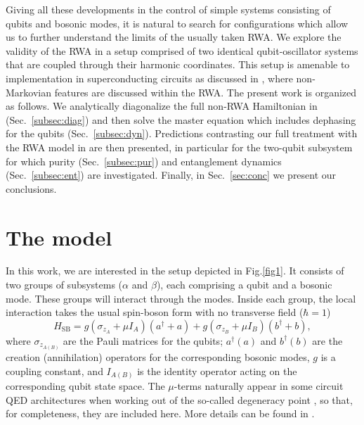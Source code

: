 \documentclass[%
reprint,
amsmath,amssymb,
aps,
pra,
]{revtex4-1}
\begin{document}
Giving all these developments in the control of simple systems consisting of qubits and bosonic modes, it is natural to search for configurations which allow us to further understand the limits of the usually taken RWA.  We explore the validity of the RWA in a setup comprised of two identical qubit-oscillator systems that are coupled through their harmonic coordinates. This setup is amenable to implementation in superconducting circuits as discussed in  \cite{car15}, where non-Markovian features are discussed within the RWA. The present work is organized as follows. We analytically diagonalize the full non-RWA Hamiltonian in (Sec.~\ref{subsec:diag}) and then solve the master equation which includes dephasing for the qubits (Sec.~\ref{subsec:dyn}). Predictions contrasting our full treatment with the RWA model in  \cite{car15} are then presented, in particular for the two-qubit subsystem for which purity (Sec.~\ref{subsec:pur}) and entanglement dynamics (Sec.~\ref{subsec:ent}) are investigated. Finally, in Sec.~\ref{sec:conc} we present our conclusions.
\section{\label{sec:model}The model}
%
%
In this work, we are interested in the setup depicted in Fig.\ref{fig1}. It consists of two groups of subsystems ($\alpha$ and $\beta$), each comprising a qubit and a bosonic mode. These groups will interact through the modes. Inside each group, the local interaction takes the usual spin-boson form with no transverse field ($\hbar=1$)
\begin{equation}
H_{\text{SB}} = g\left(\sigma_{z_A}+\mu I_A\right)\left(a^{\dagger}+a\right)+g\left(\sigma_{z_B}+\mu I_B\right)\left(b^{\dagger}+b\right),
\label{eq:sbH}
\end{equation}
where $\sigma_{z_{A(B)}}$ are the Pauli matrices for the qubits; $a^{\dagger}(a)$ and $b^{\dagger}(b)$ are the creation (annihilation) operators for the corresponding bosonic modes, $g$ is a coupling constant, and $I_{A(B)}$ is the identity operator acting on the corresponding qubit state space. The $\mu$-terms  naturally appear in some circuit QED architectures when working out of the so-called degeneracy point \cite{bla04,bla07}, so that, for completeness, they are included here. More details can be found in \cite{car15}.
\end{document}
